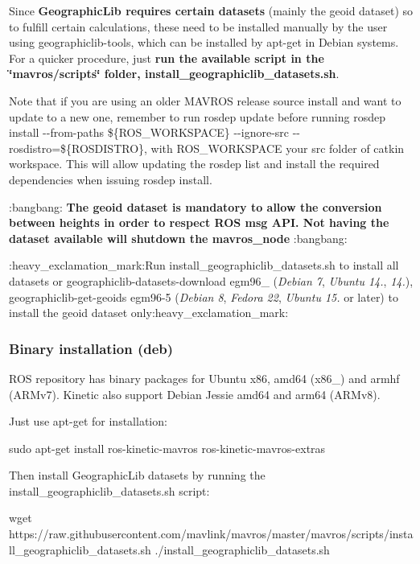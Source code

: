 Since {\bfseries{Geographic\+Lib requires certain datasets}} (mainly the geoid dataset) so to fulfill certain calculations, these need to be installed manually by the user using {\ttfamily geographiclib-\/tools}, which can be installed by {\ttfamily apt-\/get} in Debian systems. For a quicker procedure, just {\bfseries{run the available script in the \char`\"{}mavros/scripts\char`\"{} folder, {\ttfamily install\+\_\+geographiclib\+\_\+datasets.\+sh}}}.

Note that if you are using an older M\+A\+V\+R\+OS release source install and want to update to a new one, remember to run {\ttfamily rosdep update} before running {\ttfamily rosdep install -\/-\/from-\/paths \$\{R\+O\+S\+\_\+\+W\+O\+R\+K\+S\+P\+A\+CE\} -\/-\/ignore-\/src -\/-\/rosdistro=\$\{R\+O\+S\+D\+I\+S\+T\+RO\}}, with {\ttfamily R\+O\+S\+\_\+\+W\+O\+R\+K\+S\+P\+A\+CE} your src folder of catkin workspace. This will allow updating the {\ttfamily rosdep} list and install the required dependencies when issuing {\ttfamily rosdep install}.

\+:bangbang\+: {\bfseries{The geoid dataset is mandatory to allow the conversion between heights in order to respect R\+OS msg A\+PI. Not having the dataset available will shutdown the {\ttfamily mavros\+\_\+node}}} \+:bangbang\+:

\+:heavy\+\_\+exclamation\+\_\+mark\+:Run {\ttfamily install\+\_\+geographiclib\+\_\+datasets.\+sh} to install all datasets or {\ttfamily geographiclib-\/datasets-\/download egm96\+\_} ({\itshape Debian 7}, {\itshape Ubuntu 14.}, {\itshape 14.}), {\ttfamily geographiclib-\/get-\/geoids egm96-\/5} ({\itshape Debian 8}, {\itshape Fedora 22}, {\itshape Ubuntu 15.} or later) to install the geoid dataset only\+:heavy\+\_\+exclamation\+\_\+mark\+:

\subsubsection*{Binary installation (deb)}

R\+OS repository has binary packages for Ubuntu x86, amd64 (x86\+\_) and armhf (A\+R\+Mv7). Kinetic also support Debian Jessie amd64 and arm64 (A\+R\+Mv8).

Just use {\ttfamily apt-\/get} for installation\+: \begin{DoxyVerb}sudo apt-get install ros-kinetic-mavros ros-kinetic-mavros-extras
\end{DoxyVerb}


Then install Geographic\+Lib datasets by running the {\ttfamily install\+\_\+geographiclib\+\_\+datasets.\+sh} script\+: \begin{DoxyVerb}wget https://raw.githubusercontent.com/mavlink/mavros/master/mavros/scripts/install_geographiclib_datasets.sh
./install_geographiclib_datasets.sh
\end{DoxyVerb}


